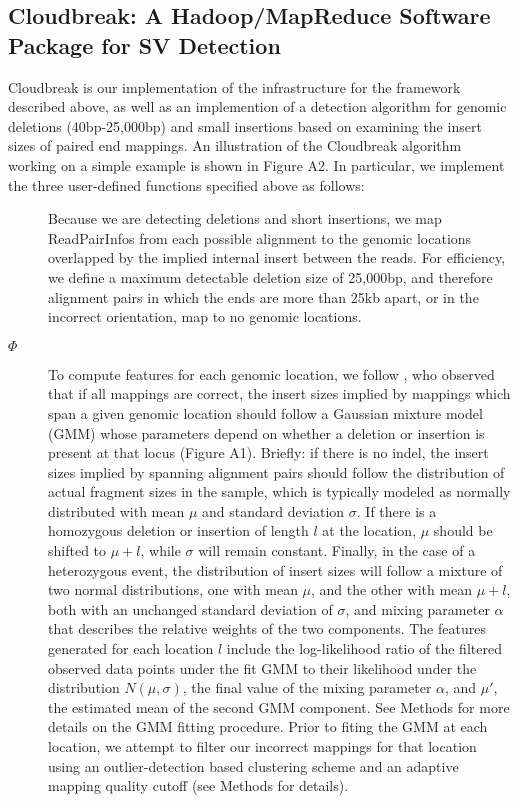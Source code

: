 \documentclass[10pt]{bmc_article}
\newenvironment{bmcformat}{\fussy\setboolean{publ}{true}}{\fussy}
\begin{document}
\begin{bmcformat}
\subsection*{Cloudbreak: A Hadoop/MapReduce Software Package for SV Detection}

Cloudbreak is our implementation of the infrastructure for the framework described above, as well as an implemention of a detection algorithm for genomic deletions (40bp-25,000bp) and small insertions based on examining the insert sizes of paired end mappings. An illustration of the Cloudbreak algorithm working on a simple example is shown in Figure A2. In particular, we implement the three user-defined functions specified above as follows:

\begin{description}
\item[] Because we are detecting deletions and short insertions, we map ReadPairInfos from each possible alignment to the genomic locations overlapped by the implied internal insert between the reads. For efficiency, we define a maximum detectable deletion size of 25,000bp, and therefore alignment pairs in which the ends are more than 25kb apart, or in the incorrect orientation, map to no genomic locations.
\item[$\Phi$] To compute features for each genomic location, we follow \cite{Lee:2009da}, who observed that if all mappings are correct, the insert sizes implied by mappings which span a given genomic location should follow a Gaussian mixture model (GMM) whose parameters depend on whether a deletion or insertion is present at that locus (Figure A1). Briefly: if there is no indel, the insert sizes implied by spanning alignment pairs should follow the distribution of actual fragment sizes in the sample, which is typically modeled as normally distributed with mean $\mu$ and standard deviation $\sigma$. If there is a homozygous deletion or insertion of length $l$ at the location, $\mu$ should be shifted to $\mu + l$, while $\sigma$ will remain constant. Finally, in the case of a heterozygous event, the distribution of insert sizes will follow a mixture of two normal distributions, one with mean $\mu$, and the other with mean $\mu + l$, both with an unchanged standard deviation of $\sigma$, and mixing parameter $\alpha$ that describes the relative weights of the two components. The features generated for each location $l$ include the log-likelihood ratio of the filtered observed data points under the fit GMM to their likelihood under the distribution $N(\mu,\sigma)$, the final value of the mixing parameter $\alpha$, and $\mu'$, the estimated mean of the second GMM component. See Methods for more details on the GMM fitting procedure. Prior to fiting the GMM at each location, we attempt to filter our incorrect mappings for that location using an outlier-detection based clustering scheme and an adaptive mapping quality cutoff (see Methods for details).


\end{description}
\end{bmcformat}
\end{document}
